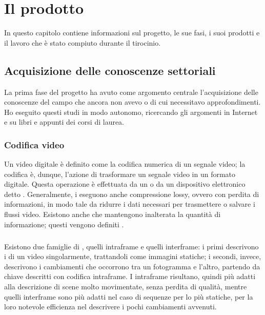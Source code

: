 \chapter{Il prodotto\label{cap:ilprodotto}}
In questo capitolo contiene informazioni sul progetto, le sue fasi, i suoi prodotti e il lavoro che è stato compiuto durante il tirocinio.

\section{Acquisizione delle conoscenze settoriali}
La prima fase del progetto ha avuto come argomento centrale l'acquisizione delle conoscenze del campo che ancora non avevo o di cui necessitavo approfondimenti. Ho eseguito questi studi in modo autonomo, ricercando gli argomenti in Internet e su libri e appunti dei corsi di laurea.

	\subsection{Codifica video}
	Un video digitale è definito come la codifica numerica di un segnale video; la codifica è, dunque, l'azione di trasformare un segnale video in un formato digitale. Questa operazione è effettuata da un  o da un dispositivo elettronico detto . Generalmente, i  eseguono anche compressione lossy, ovvero con perdita di informazioni, in modo tale da ridurre i dati necessari per trasmettere o salvare i flussi video. Esistono anche  che mantengono inalterata la quantità di informazione; questi vengono definiti .
	\paragraph*{}
	Esistono due famiglie di , quelli intraframe e quelli interframe:
	i primi descrivono i  di un video singolarmente, trattandoli come immagini statiche; i secondi, invece, descrivono i cambiamenti che occorrono tra un fotogramma e l'altro, partendo da  chiave descritti con codifica intraframe. I  intraframe risultano, quindi più adatti alla descrizione di scene molto movimentate, senza perdita di qualità, mentre quelli interframe sono più adatti nel caso di sequenze per lo più statiche, per la loro notevole efficienza nel descrivere i pochi cambiamenti avvenuti.

